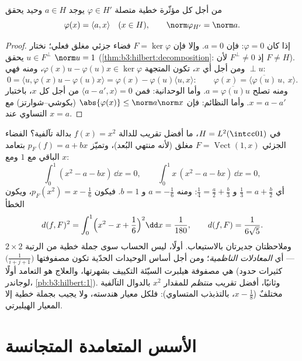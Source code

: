 \begin{theorem}\label{thm:b3:hilbert:riesz}
من أجل كل مؤثّرة خطية متصلة $\varphi \in H'$ يوجد $a \in H$
وحيد يحقق
\[
\varphi(x) = \langle a, x\rangle \quad (x \in H),
\qquad \norm\varphi_{H'} = \norm a .
\]
\end{theorem}

\begin{proof}
إذا كان $\varphi = 0$: فإن $a = 0$. وإلا فإن $F = \ker\varphi$ فضاء جزئي
مغلق فعلي؛ نختار $u \in F^\perp$ يحقق $\norm u = 1$
(\cref{thm:b3:hilbert:decomposition}: إذ $F^\perp \neq 0$ لأن $F \neq H$). ومن أجل أي
$x$، تكون المتجهة $\varphi(x)u -
\varphi(u)x \in \ker\varphi$، ومنه فهي $\perp u$:
\[
0 = \langle u, \varphi(x)u - \varphi(u)x\rangle
= \varphi(x) - \varphi(u)\langle u, x\rangle :
\qquad \varphi(x) = \langle
\overline{\varphi(u)}\,u,\ x\rangle .
\]
ومنه تصلح $a = \overline{\varphi(u)}u$. وأما الوحدانية: فمن $\langle a
- a', x\rangle = 0$ من أجل كل $x$،
باختبار $x = a - a'$. وأما النظائم: فإن $\abs{\varphi(x)} \leq \norm a\norm x$ (بكوشي--شوارتز)
مع التساوي عند $x = a$.
\end{proof}

\begin{example}
\label{ex:b3:hilbert:projectionexample}
في $H = L^2(\intcc01)$، ما أفضل تقريب للدالة $f(x) = x^2$ بدالة تآلفية؟
الفضاء الجزئي $F =
\operatorname{Vect}(1, x)$ مغلق (لأنه منتهي البُعد)، وتميّز $p_F(f) = a + bx$
بتعامد الباقي مع $1$ ومع $x$:
\[
\int_0^1(x^2 - a - bx)\,\dd x = 0,
\qquad
\int_0^1x\,(x^2 - a - bx)\,\dd x = 0,
\]
أي $\frac13 = a + \frac b2$ و $\frac14 = \frac a2 +
\frac b3$: ومنه $a = -\frac16$ و $b = 1$. فيكون
$p_F(x^2) = x -
\frac16$، ويكون الخطأ
\[
d(f, F)^2 = \int_0^1\Bigl(x^2 - x + \frac16\Bigr)^2\dd x =
\frac1{180},
\qquad d(f, F) = \frac1{6\sqrt5} .
\]
وملاحظتان جديرتان بالاستيعاب. أولًا، ليس الحساب سوى جملة خطية
من الرتبة $2\times2$ --- أي \emph{المعادلات الناظمية}؛ ومن أجل
أساس الوحيدات الحدّية تكون مصفوفتها $\bigl(\frac1{i+j+1}\bigr)$ هي مصفوفة هيلبرت
السيّئة التكييف بشهرتها، والعلاج هو التعامد أولًا (كثيرات حدود
لوجاندر، \cref{pb:b3:hilbert:1}). وثانيًا، أفضل تقريب \emph{منتظم} للمقدار
$x^2$ بالدوال التآلفية مختلفٌ ($x - \frac18$، بالتذبذب
المتساوي): فلكل معيار هندسته، ولا يجيب بجملة خطية إلا المعيار
الهيلبرتي.
\end{example}

\section{الأسس المتعامدة المتجانسة}

